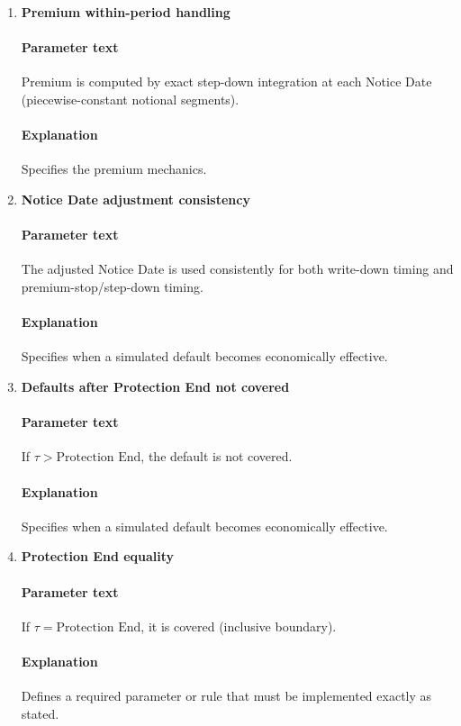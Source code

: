 \documentclass[11pt]{article}
\begin{document}
\begin{enumerate}[label=\arabic*),leftmargin=*,align=left]
\item \textbf{Premium within-period handling}
\paragraph{Parameter text} Premium is computed by exact step-down integration at each Notice Date (piecewise-constant notional segments).
\paragraph{Explanation} Specifies the premium mechanics.

\item \textbf{Notice Date adjustment consistency}
\paragraph{Parameter text} The adjusted Notice Date is used consistently for both write-down timing and premium-stop/step-down timing.
\paragraph{Explanation} Specifies when a simulated default becomes economically effective.

\item \textbf{Defaults after Protection End not covered}
\paragraph{Parameter text} If $\tau > \text{Protection End}$, the default is not covered.
\paragraph{Explanation} Specifies when a simulated default becomes economically effective.

\item \textbf{Protection End equality}
\paragraph{Parameter text} If $\tau = \text{Protection End}$, it is covered (inclusive boundary).
\paragraph{Explanation} Defines a required parameter or rule that must be implemented exactly as stated.


\end{enumerate}
\end{document}
